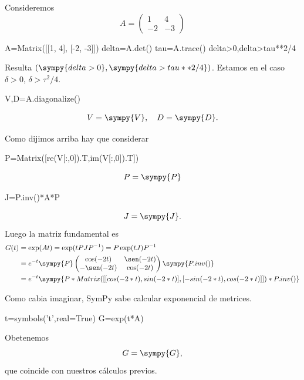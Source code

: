\begin{ejemplo}{} Consideremos
\[
 A=\begin{pmatrix}1 & 4\\
    -2 & -3
    \end{pmatrix}
\]

\begin{sympyblock}[][numbers=left,frame=single,framesep=5mm]
A=Matrix([[1, 4], [-2, -3]])
delta=A.det()
tau=A.trace()
delta>0,delta>tau**2/4
\end{sympyblock}

Resulta $(\sympy{delta>0},\sympy{delta>tau**2/4})$. Estamos en el caso $\delta>0$, $\delta>\tau^2/4$. 
\begin{sympyblock}[][numbers=left,frame=single,framesep=5mm]
V,D=A.diagonalize()
\end{sympyblock}

\[
 V=\sympy{V},\quad D=\sympy{D}.
\]

Como dijimos arriba hay que considerar

\begin{sympyblock}[][numbers=left,frame=single,framesep=5mm]
P=Matrix([re(V[:,0]).T,im(V[:,0]).T])
\end{sympyblock}
\[
 P=\sympy{P}
\]
\begin{sympyblock}[][numbers=left,frame=single,framesep=5mm]
J=P.inv()*A*P
\end{sympyblock}
\[
 J=\sympy{J}.
\]
Luego la matriz fundamental es
\[
\begin{split}
 G(t)&=\exp(At)=\exp(tPJP^{-1})=P \exp(tJ)P^{-1}\\
 &=e^{-t}\sympy{P}
 \begin{pmatrix}
  \cos(-2t) & \sen(-2t)\\
  -\sen(-2t)  &  \cos(-2t)\\
 \end{pmatrix}
\sympy{P.inv()}\\
&=
e^{-t}\sympy{P*Matrix([[cos(-2*t) , sin(-2*t)],
  [-sin(-2*t),cos(-2*t)]])*P.inv()}
\end{split}
\]

Como cabia imaginar, SymPy sabe calcular exponencial de metrices.

\begin{sympyblock}[][numbers=left,frame=single,framesep=5mm]
t=symbols('t',real=True)
G=exp(t*A)
\end{sympyblock}
Obetenemos
\[
G=\sympy{G},
\]
que coincide con nuestros cálculos previos.




\end{ejemplo}
